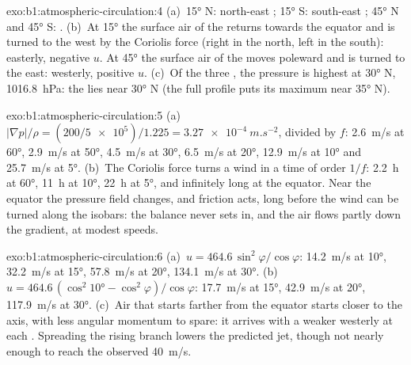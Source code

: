 \begin{solution}{exo:b1:atmospheric-circulation:4}
(a)~\ang{15} N: north-east ; \ang{15} S: south-east ;
\ang{45} N and \ang{45} S: . (b)~At \ang{15} the surface air of the  returns towards the equator and is turned to the west by the Coriolis force
(right in the north, left in the south): easterly, negative $u$. At \ang{45} the
surface air of the  moves poleward and is turned to the east: westerly,
positive $u$. (c)~Of the three , the pressure is highest at \ang{30} N,
\qty{1016.8}{hPa}: the  lies near \ang{30} N (the full profile puts
its maximum near \ang{35} N).
\end{solution}

\begin{solution}{exo:b1:atmospheric-circulation:5}
(a)~$|\nabla p|/\rho = (200/\num{5e5})/1.225 = \qty{3.27e-4}{m.s^{-2}}$, divided by
$f$: \qty{2.6}{m/s} at \ang{60}, \qty{2.9}{m/s} at \ang{50}, \qty{4.5}{m/s} at
\ang{30}, \qty{6.5}{m/s} at \ang{20}, \qty{12.9}{m/s} at \ang{10} and
\qty{25.7}{m/s} at \ang{5}. (b)~The Coriolis force turns a wind in a time of order
$1/f$: \qty{2.2}{h} at \ang{60}, \qty{11}{h} at \ang{10}, \qty{22}{h} at \ang{5}, and
infinitely long at the equator. Near the equator the pressure field changes, and
friction acts, long before the wind can be turned along the isobars: the balance
never sets in, and the air flows partly down the gradient, at modest speeds.
\end{solution}

\begin{solution}{exo:b1:atmospheric-circulation:6}
(a)~$u = 464.6\,\sin^2\varphi/\cos\varphi$: \qty{14.2}{m/s} at \ang{10},
\qty{32.2}{m/s} at \ang{15}, \qty{57.8}{m/s} at \ang{20}, \qty{134.1}{m/s} at
\ang{30}. (b)~$u = 464.6\,(\cos^2\ang{10} - \cos^2\varphi)/\cos\varphi$:
\qty{17.7}{m/s} at \ang{15}, \qty{42.9}{m/s} at \ang{20}, \qty{117.9}{m/s} at
\ang{30}. (c)~Air that starts farther from the equator starts closer to the axis,
with less angular momentum to spare: it arrives with a weaker westerly at each
. Spreading the rising branch lowers the predicted jet, though not nearly
enough to reach the observed \qty{40}{m/s}.
\end{solution}

